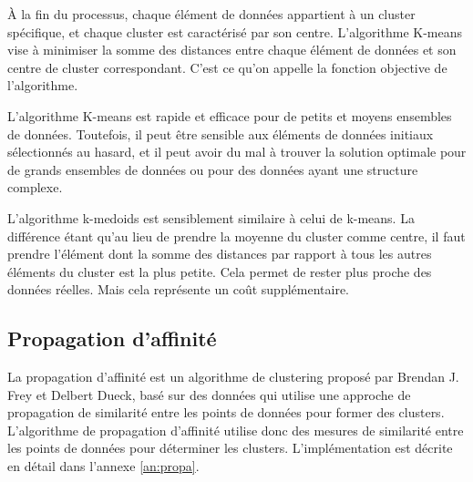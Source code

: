 À la fin du processus, chaque élément de données appartient à un cluster spécifique, et chaque cluster est caractérisé par son centre. L'algorithme K-means vise à minimiser la somme des distances entre chaque élément de données et son centre de cluster correspondant. C'est ce qu'on appelle la fonction objective de l'algorithme.

L'algorithme K-means est rapide et efficace pour de petits et moyens ensembles de données. Toutefois, il peut être sensible aux éléments de données initiaux sélectionnés au hasard, et il peut avoir du mal à trouver la solution optimale pour de grands ensembles de données ou pour des données ayant une structure complexe.

L'algorithme k-medoids est sensiblement similaire à celui de k-means. La différence étant qu'au lieu de prendre la moyenne du cluster comme centre, il faut prendre l'élément dont la somme des distances par rapport à tous les autres éléments du cluster est la plus petite. Cela permet de rester plus proche des données réelles. Mais cela représente un coût supplémentaire.

\subsection{Propagation d'affinité}
\label{propa}

La propagation d'affinité est un algorithme de clustering proposé par Brendan J. Frey et Delbert Dueck, basé sur des données qui utilise une approche de propagation de similarité entre les points de données pour former des clusters. L'algorithme de propagation d'affinité utilise donc des mesures de similarité entre les points de données pour déterminer les clusters. L'implémentation est décrite en détail dans l'annexe \ref{an:propa}.

